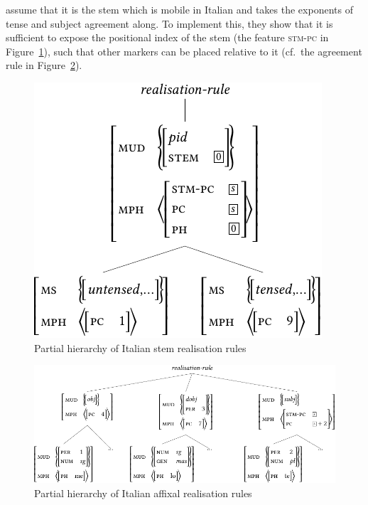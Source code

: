 \documentclass[output=paper
	        ,collection
	        ,collectionchapter
 	        ,biblatex
                ,babelshorthands
                ,newtxmath
                ,draftmode
                ,colorlinks, citecolor=brown
]{langscibook}
\begin{document}
{\citet{Crysmann:Bonami:2016} assume that it is the stem which is
mobile in Italian and takes the exponents of tense and subject
agreement along. To implement this, they show that it is sufficient to
expose the positional index of the stem (the feature \textsc{stm-pc}
in Figure~\ref{fig:ItalianStem}), such that other markers can
be placed relative to it (cf.~the agreement rule in Figure~\ref{fig:ItalianAff}).  

\begin{figure}[htb]\centering
  
  \includegraphics[scale=.9]{figures/italian-stem-crop}
  
  \caption{Partial hierarchy of Italian stem realisation rules}
  \label{fig:ItalianStem}
\end{figure}

\begin{figure}[htb]
  \centering
  \includegraphics[scale=.84]{figures/italian-affix-crop}
  
  \caption{Partial hierarchy of Italian affixal realisation rules}
  \label{fig:ItalianAff}
\end{figure}



}
\end{document}
